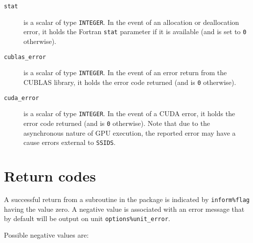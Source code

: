 \begin{description}
\item[\texttt{stat}] is a scalar of type  {\tt INTEGER}.
In the event of an allocation or deallocation error, it
holds the Fortran {\tt stat} parameter if it is available
(and is set to {\tt 0} otherwise).

\item[\texttt{cublas\_error}] is a scalar of type {\tt INTEGER}.
In the event of an error return from the CUBLAS library, it
holds the error code returned (and is {\tt 0} otherwise).

\item[\texttt{cuda\_error}] is a scalar of type {\tt INTEGER}.
In the event of a CUDA error, it holds the error code returned (and is {\tt 0}
otherwise). Note that due to the asynchronous nature of GPU execution, the
reported error may have a cause errors external to {\tt SSIDS}.

\end{description}



\section{Return codes} \label{ssids:errors}

A successful return from a subroutine in the package is indicated by
{\tt inform\%flag} having the value zero.
A negative value is associated with an error message that by default will
be output on unit {\tt options\%unit\_error}.

Possible negative values are:

